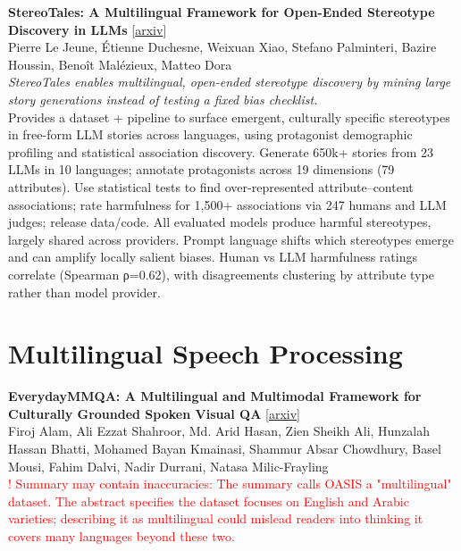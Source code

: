 \documentclass[12pt,letterpaper]{article}
\begin{document}
\medskip

{\small\textbf{StereoTales: A Multilingual Framework for Open-Ended Stereotype Discovery in LLMs}} {\scriptsize[\href{https://arxiv.org/abs/2605.10442}{arxiv}]}\\
{\scriptsize Pierre Le Jeune, \'Etienne Duchesne, Weixuan Xiao, Stefano Palminteri, Bazire Houssin, Beno\^it Mal\'ezieux, Matteo Dora}\\

{\small\textit{StereoTales enables multilingual, open-ended stereotype discovery by mining large story generations instead of testing a fixed bias checklist.}}\\[1pt]
{\footnotesize Provides a dataset + pipeline to surface emergent, culturally specific stereotypes in free-form LLM stories across languages, using protagonist demographic profiling and statistical association discovery. Generate 650k+ stories from 23 LLMs in 10 languages; annotate protagonists across 19 dimensions (79 attributes). Use statistical tests to find over-represented attribute--content associations; rate harmfulness for 1,500+ associations via 247 humans and LLM judges; release data/code. All evaluated models produce harmful stereotypes, largely shared across providers. Prompt language shifts which stereotypes emerge and can amplify locally salient biases. Human vs LLM harmfulness ratings correlate (Spearman ρ=0.62), with disagreements clustering by attribute type rather than model provider.}

\medskip


\section*{Multilingual Speech Processing}

{\small\textbf{EverydayMMQA: A Multilingual and Multimodal Framework for Culturally Grounded Spoken Visual QA}} {\scriptsize[\href{https://arxiv.org/abs/2510.06371}{arxiv}]}\\
{\scriptsize Firoj Alam, Ali Ezzat Shahroor, Md. Arid Hasan, Zien Sheikh Ali, Hunzalah Hassan Bhatti, Mohamed Bayan Kmainasi, Shammur Absar Chowdhury, Basel Mousi, Fahim Dalvi, Nadir Durrani, Natasa Milic-Frayling}\\

{\scriptsize\textcolor{red}{! Summary may contain inaccuracies: The summary calls OASIS a "multilingual" dataset. The abstract specifies the dataset focuses on English and Arabic varieties; describing it as multilingual could mislead readers into thinking it covers many languages beyond these two.}}\\[1pt]
\end{document}
